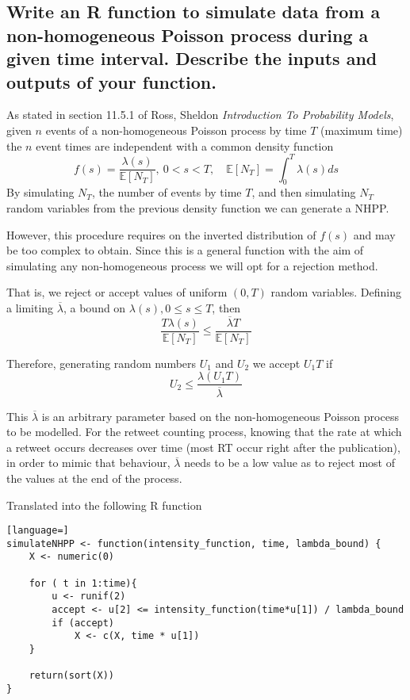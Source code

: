 \subsection{Write an R function to simulate data from a non-homogeneous Poisson process during a given time interval. Describe the inputs and outputs of your function.}

As stated in section 11.5.1 of Ross, Sheldon \textit{Introduction To Probability Models}, given $n$ events of a non-homogeneous Poisson process by time $T$ (maximum time) the $n$ event times are independent with a common density function
\[f(s) = \frac{\lambda(s)}{\mathbb{E}[N_T]},\ 0<s<T, \quad \mathbb{E}[N_T] = \int^T_0\lambda(s)ds\]
By simulating $N_T$, the number of events by time $T$, and then simulating $N_T$ random variables from the previous density function we can generate a NHPP.

However, this procedure requires on the inverted distribution of $f(s)$  and may be too complex to obtain. Since this is a general function with the aim of simulating any non-homogeneous process we will opt for a rejection method.

That is, we reject or accept values of uniform $(0, T)$ random variables. Defining a limiting $\overline\lambda$, a bound on $\lambda(s), 0\leq s \leq T$, then 
\[\frac{T \lambda(s)}{\mathbb{E}[N_T]} \leq \frac{\overline\lambda T}{\mathbb{E}[N_T]} \]

Therefore, generating random numbers $U_1$ and $U_2$ we accept $U_1T$ if
\[U_2 \leq \frac{\lambda(U_1T)}{\overline \lambda}\]

This $\overline\lambda$ is an arbitrary parameter based on the non-homogeneous Poisson process to be modelled. For the retweet counting process, knowing that the rate at which a retweet occurs decreases over time (most RT occur right after the publication), in order to mimic that behaviour, $\overline\lambda$ needs to be a low value as to reject most of the values at the end of the process.

Translated into the following R function
\begin{lstlisting}[language=]
simulateNHPP <- function(intensity_function, time, lambda_bound) {
	X <- numeric(0)
	
	for ( t in 1:time){
		u <- runif(2)
		accept <- u[2] <= intensity_function(time*u[1]) / lambda_bound
		if (accept)
			X <- c(X, time * u[1])
	}
		
	return(sort(X))
}
\end{lstlisting}

